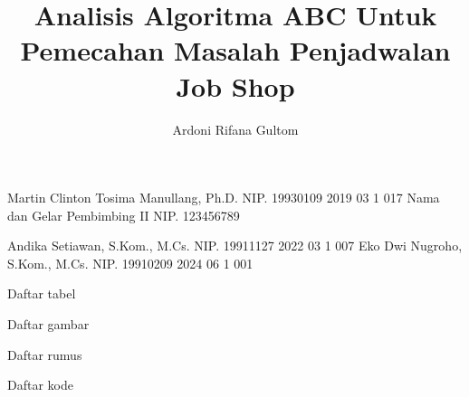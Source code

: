 \documentclass[12pt, a4paper, onecolumn, oneside, final]{report}
\begin{document}

    
    \title{Analisis Algoritma ABC Untuk Pemecahan Masalah Penjadwalan Job Shop} %
    
    \author{Ardoni Rifana Gultom}       %
    
    \dosbingA%
        {Martin Clinton Tosima Manullang, Ph.D.}%
        {NIP. 19930109 2019 03 1 017}               %
    \dosbingB%
        {Nama dan Gelar Pembimbing II}%
        {NIP. 123456789}                %
        
    \pengujiA%
        {Andika Setiawan, S.Kom., M.Cs.}%
        {NIP. 19911127 2022 03 1 007}               %
    \pengujiB%
        {Eko Dwi Nugroho, S.Kom., M.Cs.}%
        {NIP. 19910209 2024 06 1 001}               %

    \sloppy %
    \setcounter{page}{1} %



    
%    
%   

    \tableofcontents
    \pagebreak
    Daftar tabel
    \listoftables
    \pagebreak
    Daftar gambar
    \listoffigures
    \pagebreak
    Daftar rumus
    \pagestyle{daftarrumusstyle}
    \listofmyequations
    \thispagestyle{daftarrumusstyle}
    \pagebreak
    
    Daftar kode
    \lstlistoflistings
    \pagebreak
\end{document}

